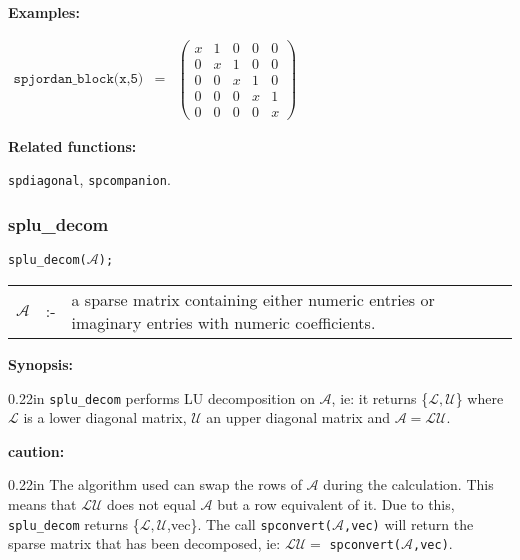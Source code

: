 \textbf{Examples:}

\begin{flushleft}  
\hspace*{0.1in}
\begin{math}        
\begin{array}{ccc}
\texttt{spjordan\_block(x,5)} & = & 
\left( \begin{array}{ccccc} x & 1 & 0 & 0 & 0 \\ 0 & x & 1 & 0 & 0 \\ 0 
& 0 & x & 1 & 0 \\ 0 & 0 & 0 & x & 1 \\ 0 & 0 & 0 & 0 & x
\end{array} \right)
\end{array}
\end{math}  
\end{flushleft}

\textbf{Related functions:}

\hspace*{0.175in} \texttt{spdiagonal}, \texttt{spcompanion}.


\subsubsection{splu\_decom}


\hspace*{0.175in} \texttt{splu\_decom($\mathcal{A}$);}

\hspace*{0.1in} 
\begin{tabular}{l l l}
$\mathcal{A}$ &:-& \parbox[t]{.848\linewidth}{a sparse matrix containing either 
numeric entries or imaginary entries with numeric coefficients.}
\end{tabular}

\textbf{Synopsis:} %

\begin{addtolength}{\leftskip}{0.22in}
              \texttt{splu\_decom} performs LU decomposition on $\mathcal{A}$,
              ie: it returns \{$\mathcal{L,U}$\} where $\mathcal{L}$
              is a lower diagonal matrix, $\mathcal{U}$ an upper diagonal
              matrix and $\mathcal{A} = \mathcal{LU}$.

\end{addtolength}

\textbf{caution:}

\begin{addtolength}{\leftskip}{0.22in}
The algorithm used can swap the rows of $\mathcal{A}$ 
                during the calculation. This means that $\mathcal{LU}$ does
                not equal $\mathcal{A}$ but a row equivalent of it. Due to
                this, \texttt{splu\_decom} returns \{$\mathcal{L,U}$,vec\}. The
                call \texttt{spconvert($\mathcal{A}$,vec)} will return the 
                sparse matrix that has been decomposed, ie: $\mathcal{LU} = $
                \texttt{spconvert($\mathcal{A}$,vec)}.

\end{addtolength}

